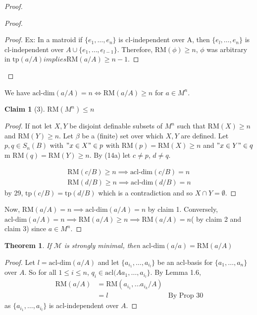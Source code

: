 \documentclass[letterpaper, 12pt]{article}
\newcommand{\cM}{\mathcal{M}}
\newcommand{\tp}{\mbox{tp}}
\newcommand{\RM}{\mbox{RM}}
\newcommand{\acl}{\mbox{acl}}
\newcommand{\acldim}{\mbox{acl-dim}}
\theoremstyle{stdthm}
\newtheorem{thm}{Theorem}[section]
\theoremstyle{stddef}
\theoremstyle{stdnonum}
\newtheorem{claim}{Claim}
\theoremstyle{stdqands}
\theoremstyle{stdbold}
\begin{document}
\begin{proof}
\begin{proof}
\begin{proof}
Ex: In a matroid if $\{e_1,\dots, e_n\}$ is cl-independent over A, then $\{e_l,\dots, e_n\}$ is cl-independent over $A \cup \{e_1,\dots, e_{l-1}\}$. Therefore, $\RM(\phi) \geq n$, $\phi$ was arbitrary in $\tp(a/A) implies \RM(a/A) \geq n-1$. 
\end{proof} 
\end{proof}
We have $\acldim(a/A) = n \iff \RM(a/A) \geq n$ for $a \in M^n$. 


\begin{claim}[3]
$\RM(M^n)\leq n$ 
\end{claim}

\begin{proof}

If not let $X,Y$ be disjoint definable subsets of $M^n$ such that $\RM(X) \geq n$ and $\RM(Y) \geq n$. Let $\beta$ be a (finite) set over which $X,Y$ are defined. Let $p,q \in S_n(B)$ with $"x\in X"\in p$ with $\RM(p) = \RM(X) \geq n$ and $"x \in Y" \in q$m $\RM(q) = \RM(Y) \geq n$. By (14a) let $c\neq p$, $d\neq q$. 

\begin{align*}
\RM(c/B) \geq n \implies \acldim(c/B) = n \\
\RM(d/B) \geq n \implies \acldim (d/B) = n
\end{align*}
by 29, $\tp(c/B) = \tp(d/B)$ which is a contradiction and so $X\cap Y = \emptyset$. 

\end{proof}

Now, $\RM(a/A) = n \implies \acldim(a/A) = n$ by claim 1. Conversely, $\acldim(a/A) = n \implies \RM(a/A) \geq n \implies \RM(a/A) = n$( by claim 2 and claim 3) since $a \in M^n$. 
\end{proof}



\begin{thm}
If $\cM$ is strongly minimal, then $\acldim(a/a) = \RM(a/A)$
\end{thm}

\begin{proof}
Let $l = \acldim(a/A)$ and let $\{a_{i_1},\dots,a_{i_l}\}$ be an acl-basis for $\{a_1,\dots,a_n\}$ over $A$. So for all $1\leq i \leq n$, $q_i \in \acl(Aa_1,\dots,a_{i_l}\}$. By Lemma 1.6, 
\begin{align*}
\RM(a/A) &= \RM(a_{i_1},\dots a_{i_k} /A) \\
&= l &\text{By Prop 30}
\end{align*}
as $\{a_{i_1},\dots,a_{i_l}\}$ is acl-independent over $A$. 

\end{proof}
\end{document}
